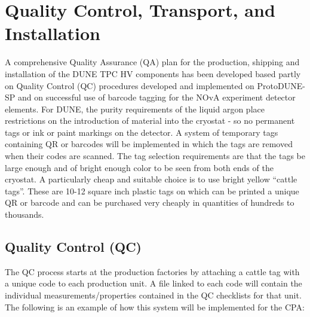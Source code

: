 \clearpage
\section{Quality Control, Transport, and Installation}
\label{sec:fdsp-hv-transport}
A comprehensive Quality Assurance (QA) plan for the production, shipping and installation of the DUNE TPC HV components has been developed based partly on Quality Control (QC) procedures developed and implemented on ProtoDUNE-SP and on successful use of barcode tagging for the NOvA experiment detector elements.  For DUNE, the purity requirements of the liquid argon place restrictions on the introduction of material into the cryostat - so no permanent tags or ink or paint markings on the detector.  A system of temporary tags containing QR or barcodes will be implemented in which the tags are removed when their codes are scanned.  The tag selection requirements are that the tags be large enough and of bright enough color to be seen from both ends of the cryostat.  A particularly cheap and suitable choice is to use bright yellow “cattle tags”.  These are 10-12 square inch plastic tags on which can be printed a unique QR or barcode and can be purchased very cheaply in quantities of hundreds to thousands.
\subsection{Quality Control (QC)}
\label{sec:fdsp-hv-transport-QC}
The QC process starts at the production factories by attaching a cattle tag with a unique code to each production unit.  A file linked to each code will contain the individual measurements/properties contained in the QC checklists for that unit.  The following is an example of how this system will be implemented for the CPA:

